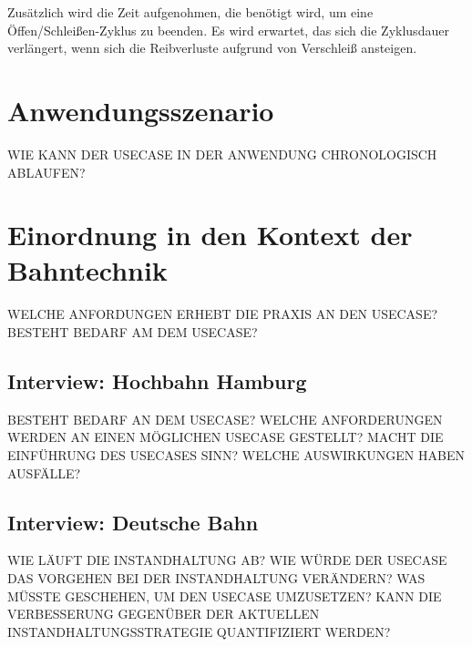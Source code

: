 Zusätzlich wird die Zeit aufgenohmen, die benötigt wird, um eine Öffen/Schleißen-Zyklus zu beenden. Es wird erwartet, das sich die Zyklusdauer verlängert, wenn sich die Reibverluste aufgrund von Verschleiß ansteigen.

\section{Anwendungsszenario}
\label{sec:anwendungsszenario_usecase}
WIE KANN DER USECASE IN DER ANWENDUNG CHRONOLOGISCH ABLAUFEN?

\section{Einordnung in den Kontext der Bahntechnik}
\label{sec:kontext_bahntechnik_von_usecase}
WELCHE ANFORDUNGEN ERHEBT DIE PRAXIS AN DEN USECASE? BESTEHT BEDARF AM DEM USECASE?

\subsection{Interview: Hochbahn Hamburg}
\label{subsec:interview_hochbahn}
BESTEHT BEDARF AN DEM USECASE? WELCHE ANFORDERUNGEN WERDEN AN EINEN MÖGLICHEN USECASE GESTELLT? MACHT DIE EINFÜHRUNG DES USECASES SINN? WELCHE AUSWIRKUNGEN HABEN AUSFÄLLE? 

\subsection{Interview: Deutsche Bahn}
\label{subsec:interview_deutsche_bahn}
WIE LÄUFT DIE INSTANDHALTUNG AB? WIE WÜRDE DER USECASE DAS VORGEHEN BEI DER INSTANDHALTUNG VERÄNDERN? WAS MÜSSTE GESCHEHEN, UM DEN USECASE UMZUSETZEN? KANN DIE VERBESSERUNG GEGENÜBER DER AKTUELLEN INSTANDHALTUNGSSTRATEGIE QUANTIFIZIERT WERDEN?